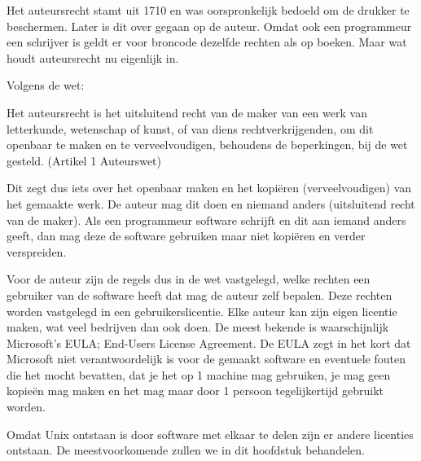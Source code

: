 Het auteursrecht stamt uit 1710 en was oorspronkelijk bedoeld om de drukker te beschermen. Later is dit over gegaan op
de auteur. Omdat ook een programmeur een schrijver is geldt er voor broncode dezelfde rechten als op boeken. Maar wat
houdt auteursrecht nu eigenlijk in.

{
Volgens de wet:}

{
{\textquotedbl}Het auteursrecht is het uitsluitend recht van de maker van een werk van letterkunde,
wetenschap of kunst, of van diens rechtverkrijgenden, om dit openbaar te maken en te verveelvoudigen, behoudens de
beperkingen, bij de wet gesteld.{\textquotedbl} (Artikel 1 Auteurswet) }

{
Dit zegt dus iets over het openbaar maken en het kopi\"eren (verveelvoudigen) van het gemaakte werk. De auteur mag dit
doen en niemand anders (uitsluitend recht van de maker). Als een programmeur software schrijft en dit aan iemand anders
geeft, dan mag deze de software gebruiken maar niet kopi\"eren en verder verspreiden.}

{
Voor de auteur zijn de regels dus in de wet vastgelegd, welke rechten een gebruiker van de software heeft dat mag de
auteur zelf bepalen. Deze rechten worden vastgelegd in een gebruikerslicentie. Elke auteur kan zijn eigen licentie
maken, wat veel bedrijven dan ook doen. De meest bekende is waarschijnlijk Microsoft's EULA; End-Users
License Agreement. De EULA zegt in het kort dat Microsoft niet verantwoordelijk is voor de gemaakt software en
eventuele fouten die het mocht bevatten, dat je het op 1 machine mag gebruiken, je mag geen kopie\"en mag maken en het mag
maar door 1 persoon tegelijkertijd gebruikt worden.}

{
Omdat Unix ontstaan is door software met elkaar te delen zijn er andere licenties ontstaan. De
meestvoorkomende zullen we in dit hoofdstuk behandelen.}

